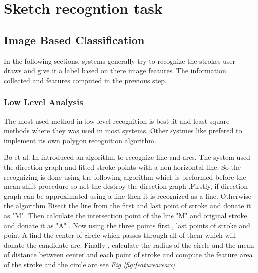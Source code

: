 \section{Sketch recogntion task}
\label{sec:sketchRecogntionTask}
\subsection{Image Based Classification}
\label{sec:Image Based Classification}

In the following sections, systems generally try to recognize the strokes user draws and give it a label based on there image features. The information collected and features computed in the previous step.
 \subsubsection{Low Level Analysis}
\label{sec:Low Level Analysis}

%
	





%

 
The most used method in low level recognition is best fit and least square methods where they was used in most systems. Other systmes like \cite{polygonfeedback31} prefered to implement its own polygon recognition algorithm.

Bo et al. In \cite{meanshift10} introduced an algorithm to recognize line and arcs.  The system used the direction graph and fitted stroke points with a non horizontal line. So the recognizing is done using the following algorithm which is preformed before the mean shift procedure so not the destroy the direction graph .Firstly, if direction graph can be approximated using a line then it is recognized as a line. Otherwise the algorithm Bisect the line from the first and last  point of stroke and donate it as "M". Then calculate the intersection point of the line "M" and original stroke and donate it as "A" . Now using the three points first , last points of stroke and point A find the center of circle which passes through all of them which will donate the candidate arc. Finally , calculate the radius of the circle and the mean of distance  between center and each point of stroke and  compute the feature area of the stroke and the circle arc see \textit{Fig \ref{fig:featurearearc}}.


